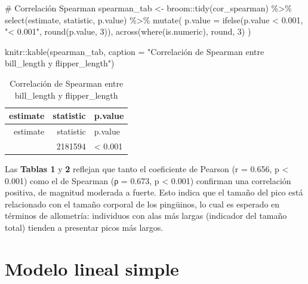 \documentclass[
  spanish,
  11pt,
  a4paper,
  DIV=11,
  numbers=noendperiod]{scrartcl}
\newenvironment{Shaded}{\begin{snugshade}}{\end{snugshade}}
\newcommand{\AttributeTok}[1]{\textcolor[rgb]{0.40,0.45,0.13}{#1}}
\newcommand{\CommentTok}[1]{\textcolor[rgb]{0.37,0.37,0.37}{#1}}
\newcommand{\DecValTok}[1]{\textcolor[rgb]{0.68,0.00,0.00}{#1}}
\newcommand{\FloatTok}[1]{\textcolor[rgb]{0.68,0.00,0.00}{#1}}
\newcommand{\FunctionTok}[1]{\textcolor[rgb]{0.28,0.35,0.67}{#1}}
\newcommand{\NormalTok}[1]{\textcolor[rgb]{0.00,0.23,0.31}{#1}}
\newcommand{\OtherTok}[1]{\textcolor[rgb]{0.00,0.23,0.31}{#1}}
\newcommand{\SpecialCharTok}[1]{\textcolor[rgb]{0.37,0.37,0.37}{#1}}
\newcommand{\StringTok}[1]{\textcolor[rgb]{0.13,0.47,0.30}{#1}}
\begin{document}
\begin{Shaded}
\begin{Highlighting}[numbers=left,,]
\CommentTok{\# Correlación Spearman}
\NormalTok{spearman\_tab }\OtherTok{\textless{}{-}}\NormalTok{ broom}\SpecialCharTok{::}\FunctionTok{tidy}\NormalTok{(cor\_spearman) }\SpecialCharTok{\%\textgreater{}\%}
  \FunctionTok{select}\NormalTok{(estimate, statistic, p.value) }\SpecialCharTok{\%\textgreater{}\%}
  \FunctionTok{mutate}\NormalTok{(}
    \AttributeTok{p.value =} \FunctionTok{ifelse}\NormalTok{(p.value }\SpecialCharTok{\textless{}} \FloatTok{0.001}\NormalTok{, }\StringTok{"\textless{} 0.001"}\NormalTok{, }\FunctionTok{round}\NormalTok{(p.value, }\DecValTok{3}\NormalTok{)),}
    \FunctionTok{across}\NormalTok{(}\FunctionTok{where}\NormalTok{(is.numeric), round, }\DecValTok{3}\NormalTok{)}
\NormalTok{  )}

\NormalTok{knitr}\SpecialCharTok{::}\FunctionTok{kable}\NormalTok{(spearman\_tab, }\AttributeTok{caption =} \StringTok{"Correlación de Spearman }
\StringTok{             entre bill\_length y flipper\_length"}\NormalTok{)}
\end{Highlighting}
\end{Shaded}

\begin{longtable}[]{@{}rrl@{}}
\caption{Correlación de Spearman entre bill\_length y
flipper\_length}\tabularnewline
\toprule\noalign{}
estimate & statistic & p.value \\
\midrule\noalign{}
\endfirsthead
\toprule\noalign{}
estimate & statistic & p.value \\
\midrule\noalign{}
\endhead
\bottomrule\noalign{}
\endlastfoot
0.673 & 2181594 & \textless{} 0.001 \\
\end{longtable}

Las \textbf{Tablas 1} y \textbf{2} reflejan que tanto el coeficiente de
Pearson (r = 0.656, p \textless{} 0.001) como el de Spearman (ρ = 0.673,
p \textless{} 0.001) confirman una correlación positiva, de magnitud
moderada a fuerte. Esto indica que el tamaño del pico está relacionado
con el tamaño corporal de los pingüinos, lo cual es esperado en términos
de allometría: individuos con alas más largas (indicador del tamaño
total) tienden a presentar picos más largos.

\section{Modelo lineal simple}\label{modelo-lineal-simple}
\end{document}
